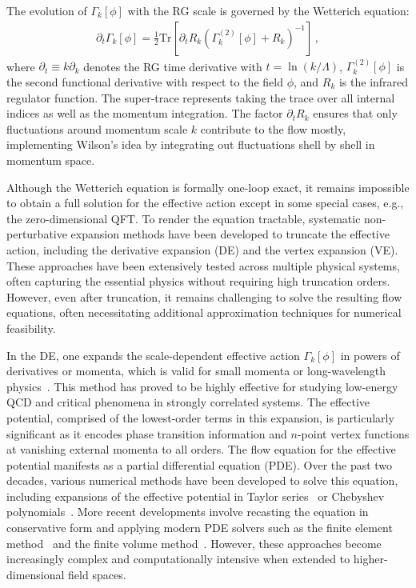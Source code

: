 \documentclass[reprint,twocolumn,superscriptaddress,preprintnumbers,amsmath,amssymb,aps,prd,floatfix]{revtex4-2}
\begin{document}
The evolution of $\Gamma_k[\phi]$ with the RG scale is governed by the Wetterich equation:
\begin{align}
\partial_t \Gamma_k[\phi] = \frac{1}{2} \text{Tr} \left[ \partial_t R_k \left( \Gamma_k^{(2)}[\phi] + R_k \right)^{-1} \right]\,,
\label{eq:wetterich}
\end{align}
where $\partial_t \equiv k \partial_k$ denotes the RG time derivative with $t=\ln (k/\Lambda)$, $\Gamma_k^{(2)}[\phi]$ is the second functional derivative with respect to the field $\phi$, and $R_k$ is the infrared regulator function. The super-trace represents taking the trace over all internal indices as well as the momentum integration. The factor $\partial_t R_k$ ensures that only fluctuations around momentum scale $k$ contribute to the flow mostly, implementing Wilson's idea by integrating out fluctuations shell by shell in momentum space.

Although the Wetterich equation is formally one-loop exact, it remains impossible to obtain a full solution for the effective action except in some special cases, e.g., the zero-dimensional QFT. To render the equation tractable, systematic non-perturbative expansion methods have been developed to truncate the effective action, including the derivative expansion (DE) and the vertex expansion (VE). These approaches have been extensively tested across multiple physical systems, often capturing the essential physics without requiring high truncation orders. However, even after truncation, it remains challenging to solve the resulting flow equations, often necessitating additional approximation techniques for numerical feasibility.

In the DE, one expands the scale-dependent effective action $\Gamma_k[\phi]$ in powers of derivatives or momenta, which is valid for small momenta or long-wavelength physics~\cite{Balog:2019rrg,DePolsi:2020pjk}. This method has proved to be highly effective for studying low-energy QCD and critical phenomena in strongly correlated systems. The effective potential, comprised of the lowest-order terms in this expansion, is particularly significant as it encodes phase transition information and $n$-point vertex functions at vanishing external momenta to all orders. The flow equation for the effective potential manifests as a partial differential equation (PDE). Over the past two decades, various numerical methods have been developed to solve this equation, including expansions of the effective potential in Taylor series~\cite{Litim:2002cf} or Chebyshev polynomials~\cite{Borchardt:2015rxa,Borchardt:2016pif,Chen:2021iuo}. More recent developments involve recasting the equation in conservative form and applying modern PDE solvers such as the finite element method~\cite{Grossi:2019urj,Sattler:2024ozv} and the finite volume method~\cite{Zorbach:2024rre}. However, these approaches become increasingly complex and computationally intensive when extended to higher-dimensional field spaces.
\end{document}
